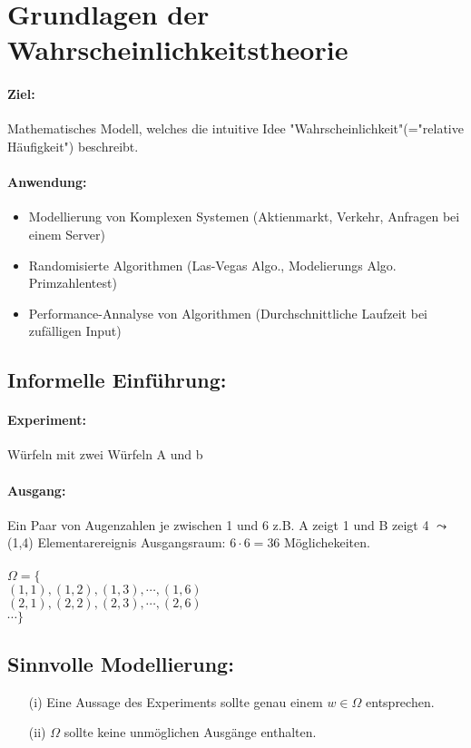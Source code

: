 \documentclass{article}
\begin{document}
\section*{Grundlagen der Wahrscheinlichkeitstheorie}

\paragraph*{Ziel:} Mathematisches Modell, welches die intuitive Idee "Wahrscheinlichkeit"(="relative Häufigkeit") beschreibt.
\paragraph*{Anwendung:} 
\begin{itemize}
    \item Modellierung von Komplexen Systemen (Aktienmarkt, Verkehr, Anfragen bei einem Server)
    \item Randomisierte Algorithmen (Las-Vegas Algo., Modelierungs Algo. Primzahlentest)
    \item Performance-Annalyse von Algorithmen (Durchschnittliche Laufzeit bei zufälligen Input)
\end{itemize}

\subsection*{Informelle Einführung:}
\paragraph*{Experiment:} Würfeln mit zwei Würfeln A und b
\paragraph*{Ausgang:} Ein Paar von Augenzahlen je zwischen 1 und 6 z.B. A zeigt 1 und B zeigt 4 \(\leadsto\) (1,4) Elementarereignis
Ausgangsraum: \(6 \cdot 6 = 36\) Möglichekeiten.\\
\\ \(\Omega = \{\) 
\\ \((1,1), (1,2), (1,3), \cdots, (1,6)\)
\\ \((2,1), (2,2), (2,3), \cdots, (2,6)\)
\\ \(\cdots\}\)

\subsection*{Sinnvolle Modellierung: }
\begin{itemize}
    \item[(i)] Eine Aussage des Experiments sollte genau einem \(w \in \Omega\) entsprechen.
    \item[(ii)] \(\Omega\) sollte keine unmöglichen Ausgänge enthalten.
\end{itemize}
\end{document}
